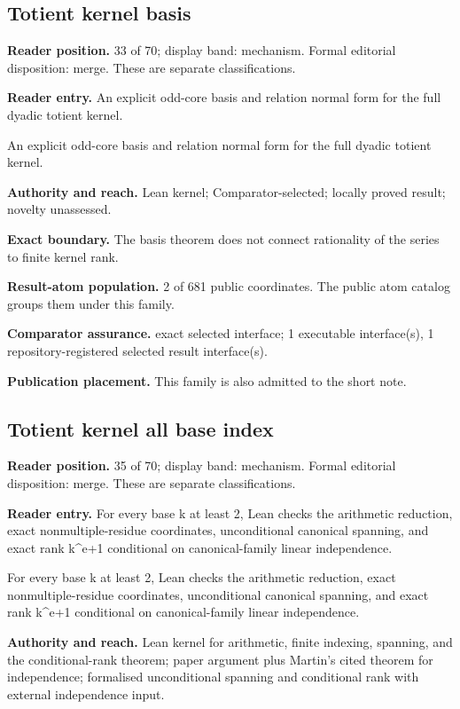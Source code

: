 \subsection{Totient kernel basis}
\textbf{Reader position.} 33 of 70; display band: mechanism.  Formal editorial disposition: merge.  These are separate classifications.

\textbf{Reader entry.} An explicit odd-core basis and relation normal form for the full dyadic totient kernel.

An explicit odd-core basis and relation normal form for the full dyadic totient kernel.

\textbf{Authority and reach.} Lean kernel; Comparator-selected; locally proved result; novelty unassessed.

\textbf{Exact boundary.} The basis theorem does not connect rationality of the series to finite kernel rank.

\textbf{Result-atom population.} 2 of 681 public coordinates. The public atom catalog groups them under this family.

\textbf{Comparator assurance.} exact selected interface; 1 executable interface(s), 1 repository-registered selected result interface(s).

\textbf{Publication placement.} This family is also admitted to the short note.

\subsection{Totient kernel all base index}
\textbf{Reader position.} 35 of 70; display band: mechanism.  Formal editorial disposition: merge.  These are separate classifications.

\textbf{Reader entry.} For every base k at least 2, Lean checks the arithmetic reduction, exact nonmultiple-residue coordinates, unconditional canonical spanning, and exact rank k\textasciicircum{}e+1 conditional on canonical-family linear independence.

For every base k at least 2, Lean checks the arithmetic reduction, exact nonmultiple-residue coordinates, unconditional canonical spanning, and exact rank k\textasciicircum{}e+1 conditional on canonical-family linear independence.

\textbf{Authority and reach.} Lean kernel for arithmetic, finite indexing, spanning, and the conditional-rank theorem; paper argument plus Martin's cited theorem for independence; formalised unconditional spanning and conditional rank with external independence input.

